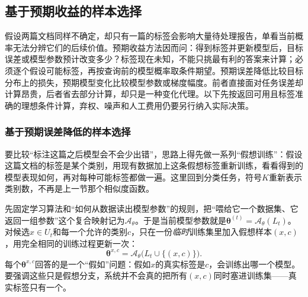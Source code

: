 \subsection{基于预期收益的样本选择}
\label{sec:knowledge-acquisition-human-expected-utility-selection}

假设两篇文档同样不确定，却只有一篇的标签会影响大量待处理报告，单看当前概率无法分辨它们的后续价值。预期收益方法因而问：得到标签并更新模型后，目标误差或模型参数预计改变多少？标签现在未知，不能只挑最有利的答案来计算；必须逐个假设可能标签，再按查询前的模型概率取条件期望。预期误差降低比较目标分布上的损失，预期模型变化比较模型参数或梯度幅度。前者直接面对任务误差却计算昂贵，后者省去部分计算，却只是一种变化代理。以下先按返回可用且标签准确的理想条件计算，弃权、噪声和人工费用仍要另行纳入实际决策。

\subsubsection{基于预期误差降低的样本选择}
\label{sec:knowledge-acquisition-human-expected-error-reduction}

要比较“标注这篇之后模型会不会少出错”，思路上得先做一系列“假想训练”：假设这篇文档的标签是某个类别，用现有数据加上这条假想标签重新训练，看看得到的模型表现如何，再对每种可能标签都做一遍。这里回到分类任务，符号$K$重新表示类别数，不再是上一节那个相似度函数。

先固定学习算法和“如何从数据读出模型参数”的规则，把“喂给它一个数据集、它返回一组参数”这个复合映射记为$\mathcal{A}_{\theta}$。于是当前模型参数就是$\bm{\theta}^{(t)}=\mathcal{A}_{\theta}(L_t)$。对候选$x\in U_t$和每一个允许的类别$c$，只在一份\emph{临时}训练集里加入假想样本$(x,c)$，用完全相同的训练过程更新一次：
\begin{equation}
  \bm{\theta}^{x,c}
  =\mathcal{A}_{\theta}\bigl(L_t\cup\{(x,c)\}\bigr).
  \label{eq:knowledge-acquisition-human-hypothetical-update}
\end{equation}
每个$\bm{\theta}^{x,c}$回答的是一个“假如”问题：假如$x$的真实标签是$c$，会训练出哪一个模型。要强调这些只是假想分支，系统并不会真的把所有$(x,c)$同时塞进训练集——真实标签只有一个。

